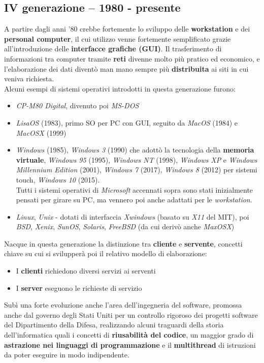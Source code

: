 \documentclass[12pt, letterpaper]{article}
\begin{document}
\subsection{IV generazione -- 1980 - presente}
A partire dagli anni '80 crebbe fortemente lo sviluppo delle \textbf{workstation} e dei \textbf{personal computer}, il cui utilizzo venne fortemente semplificato grazie all'introduzione delle \textbf{interfacce grafiche (GUI)}. Il trasferimento di informazioni tra computer tramite \textbf{reti} divenne molto più pratico ed economico, e l'elaborazione dei dati diventò man mano sempre più \textbf{distribuita} ai siti in cui veniva richiesta. \\
Alcuni esempi di sistemi operativi introdotti in questa generazione furono:
\begin{itemize}
    \item \textit{CP-M80 Digital}, divenuto poi \textit{MS-DOS}
    \item \textit{LisaOS} (1983), primo SO per PC con GUI, seguito da \textit{MacOS} (1984) e \textit{MacOSX} (1999)
    \item \textit{Windows} (1985), \textit{Windows 3} (1990) che adottò la tecnologia della \textbf{memoria virtuale}, \textit{Windows 95} (1995), \textit{Windows NT} (1998), \textit{Windows XP} e \textit{Windows Millennium Edition} (2001), \textit{Windows 7} (2017), \textit{Windows 8} (2012) per sistemi touch, \textit{Windows 10} (2015). \\
Tutti i sistemi operativi di \textit{Microsoft} accennati sopra sono stati inizialmente pensati per girare su PC, ma vennero poi anche adattati per le \textit{workstation}.
    \item \textit{Linux}, \textit{Unix} - dotati di interfaccia \textit{Xwindows} (basato su \textit{X11} del MIT), poi \textit{BSD}, \textit{Xenix}, \textit{SunOS}, \textit{Solaris}, \textit{FreeBSD} (da cui derivò anche \textit{MaxOSX})
\end{itemize}
Nacque in questa generazione la distinzione tra \textbf{cliente} e \textbf{servente}, concetti chiave su cui si svilupperà poi il relativo modello di elaborazione:
\begin{itemize}
    \item I \textbf{clienti} richiedono diversi servizi ai serventi
    \item I \textbf{server} eseguono le richieste di servizio
\end{itemize}
Subì una forte evoluzione anche l'area dell'ingegneria del software, promossa anche dal governo degli Stati Uniti per un controllo rigoroso dei progetti software del Dipartimento della Difesa, realizzando alcuni traguardi della storia dell'informatica quali i concetti di \textbf{riusabilità del codice}, un maggior grado di \textbf{astrazione nei linguaggi di programmazione} e il \textbf{multithread} di istruzioni da poter eseguire in modo indipendente. \\ \\
\end{document}
